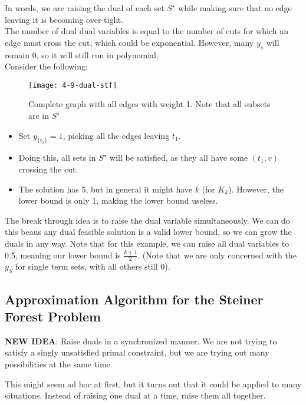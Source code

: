 \documentclass[../main/main.tex]{subfiles}
\begin{document}
In words, we are raising the dual of each set $S^{\star}$ while making sure that no edge leaving it is becoming over-tight.\\

The number of dual dual variables is equal to the number of cuts for which an edge must cross the cut, which could be exponential. However, many $y_s$ will remain 0, so it will still run in polynomial.\\

Consider the following:
\begin{figure}[h!]
	\centering
	\texttt{[image: 4-9-dual-stf]}
	\caption{Complete graph with all edges with weight 1. Note that all subsets are in $S^\star$ }
	\label{fig:4-9-stf}
\end{figure}
 \begin{itemize}
	\item Set $y_{\{t_1\} }=1$, picking all the edges leaving $t_1$. 
	\item Doing this, all sets in $S^{\star}$ will be satisfied, as they all have some $(t_1,v)$ crossing the cut.
	\item The solution has 5, but in general it might have $k$ (for  $K_k$). However, the lower bound is only 1, making the lower bound useless.
\end{itemize}
The break through idea is to raise the dual variable simultaneously. We can do this beaus any dual feasible solution is a valid lower bound, so we can grow the duals in any way. Note that for this example, we can raise all dual variables to 0.5, meaning our lower bound is $\frac{k+1}{2}$. (Note that we are only concerned with the $y_S$ for single term sets, with all others still 0).\\
\subsection{Approximation Algorithm for the Steiner Forest Problem}
\begin{remark}
	\textbf{NEW IDEA}: Raise duals in a synchronized manner. We are not trying to satisfy a singly unsatisfied primal constraint, but we are trying out many possibilities at the same time.
\end{remark}
This might seem ad hoc at first, but it turns out that it could be applied to many situations. Instead of raising one dual at a time, raise them all together.\\
\end{document}
